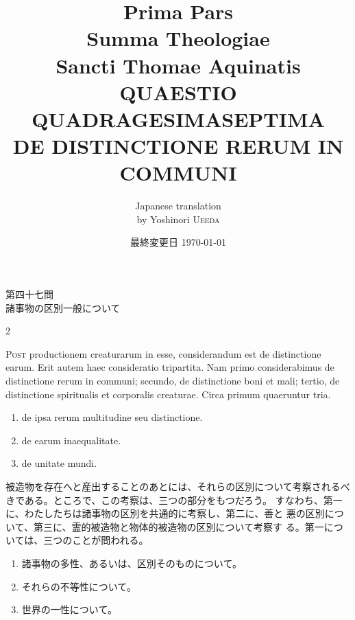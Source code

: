 \documentclass[paper=a4paper,fontsize=10pt,jafontsize=9pt,titlepage]{jlreq}
\title{{\bfseries Prima Pars}\\{\Huge Summa Theologiae}\\Sancti Thomae
Aquinatis\\QUAESTIO QUADRAGESIMASEPTIMA\\{\bfseries DE DISTINCTIONE RERUM IN COMMUNI}}
\author{Japanese translation\\by Yoshinori {\scshape Ueeda}}
\date{最終変更日 \today}
\begin{document}
\maketitle

\begin{center}
 {\Large 第四十七問\\諸事物の区別一般について}
\end{center}
\begin{paracol}{2}

{\huge P}{\scshape ost} productionem creaturarum in esse,
considerandum est de distinctione earum. Erit autem haec consideratio
tripartita. Nam primo considerabimus de distinctione rerum in communi;
secundo, de distinctione boni et mali; tertio, de distinctione
spiritualis et corporalis creaturae. Circa primum quaeruntur
tria. 
\begin{enumerate}
 \item de ipsa rerum multitudine seu distinctione. 
 \item de earum inaequalitate. 
 \item de unitate mundi.
\end{enumerate}


\switchcolumn


被造物を存在へと産出することのあとには、それらの区別について考察されるべ
 きである。ところで、この考察は、三つの部分をもつだろう。
すなわち、第一に、わたしたちは諸事物の区別を共通的に考察し、第二に、善と
 悪の区別について、第三に、霊的被造物と物体的被造物の区別について考察す
 る。第一については、三つのことが問われる。
\begin{enumerate}
 \item 諸事物の多性、あるいは、区別そのものについて。
 \item それらの不等性について。
 \item 世界の一性について。
\end{enumerate}


\switchcolumn*



\end{paracol}
\newpage
{}

{}
\setcounter{section}{47}
\setcounter{subsection}{0}
\end{document}
